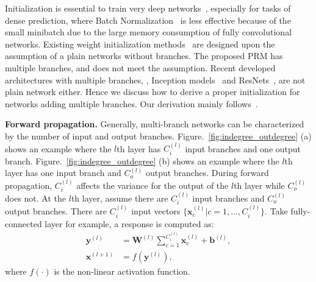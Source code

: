 \documentclass[10pt,twocolumn,letterpaper]{article}
\newcommand{\smalltitle}[1]{\vspace{0.2em}\noindent \textbf{{#1}}}
\newcommand{\W}{\mathbf{W}}
\newcommand{\bb}{\mathbf{b}}
\newcommand{\bx}{\mathbf{x}}
\newcommand{\by}{\mathbf{y}}
\begin{document}
Initialization is essential to train very deep networks~\cite{glorot2010understanding,simonyan2014very,he2015delving}, especially for tasks of dense prediction, where Batch Normalization~\cite{ioffe2015batch} is less effective because of the small minibatch due to the large memory consumption of fully convolutional networks.  
Existing weight initialization methods~\cite{krizhevsky2012imagenet,glorot2010understanding,he2015delving} are designed upon the assumption of a plain networks without branches. 
The proposed PRM has multiple branches, and does not meet the assumption. 
Recent developed architectures with multiple branches, \eg, Inception models~\cite{szegedy2015going,ioffe2015batch,szegedy2016rethinking,szegedy2016inception} and ResNets~\cite{he2016deep,he2016identity}, are not plain network either. 
Hence we discuss how to derive a proper initialization for networks adding multiple branches. 
Our derivation mainly follows~\cite{glorot2010understanding,he2015delving}. 


\smalltitle{Forward propagation. }
Generally, multi-branch networks can be characterized by the number of input and output branches. 
Figure.~\ref{fig:indegree_outdegree} (a) shows an example where the $l$th layer has $C_i^{(l)}$ input branches and one output branch. Figure.~\ref{fig:indegree_outdegree} (b) shows an example where the  $l$th layer has one input branch and $C_o^{(l)}$ output branches. 
During forward propagation,  $C_{i}^{(l)}$ affects the variance for the output of the $l$th layer while $C_{o}^{(l)}$ does not. 
At the $l$th layer, assume there are $C_{i}^{(l)}$ input branches and $C_{o}^{(l)}$ output branches. There are $C_{i}^{(l)}$ input vectors $\{\bx_c^{(l)}|c=1, \ldots, C_i^{(l)}\}$.
Take fully-connected layer for example, a response is computed as:
{\small
\begin{align}
\by^{(l)}   &= \W^{(l)}\sum_{c=1}^{C^{(l)}_i}\bx^{(l)}_c + \bb^{(l)}, \\
\bx^{(l+1)} &= f\left(\by^{(l)} \right),\label{eq:relu}
\end{align}
}
\!\!where $f(\cdot)$ is the non-linear activation function.
\end{document}
